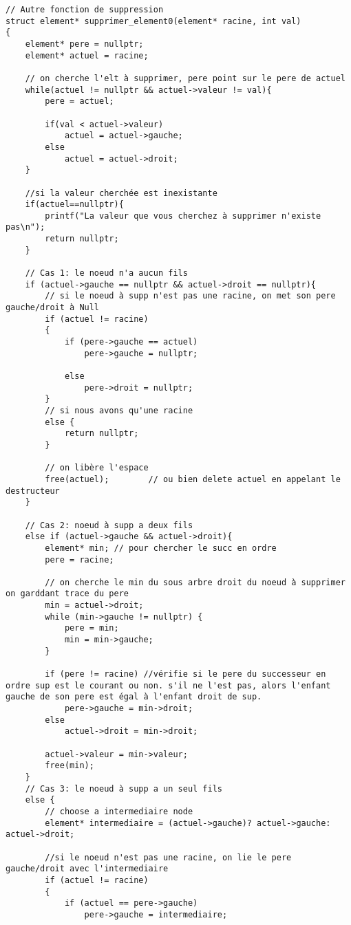 \begin{verbatim}
// Autre fonction de suppression
struct element* supprimer_element0(element* racine, int val)
{
    element* pere = nullptr;
    element* actuel = racine;
 
    // on cherche l'elt à supprimer, pere point sur le pere de actuel
    while(actuel != nullptr && actuel->valeur != val){
        pere = actuel;

        if(val < actuel->valeur)
            actuel = actuel->gauche;
        else
            actuel = actuel->droit;
    } 
 
    //si la valeur cherchée est inexistante
    if(actuel==nullptr){
        printf("La valeur que vous cherchez à supprimer n'existe pas\n");
        return nullptr;
    }
 
    // Cas 1: le noeud n'a aucun fils
    if (actuel->gauche == nullptr && actuel->droit == nullptr){
        // si le noeud à supp n'est pas une racine, on met son pere gauche/droit à Null
        if (actuel != racine)
        {
            if (pere->gauche == actuel) 
                pere->gauche = nullptr;
            
            else 
                pere->droit = nullptr;
        }
        // si nous avons qu'une racine
        else {
            return nullptr;
        }

        // on libère l'espace
        free(actuel);        // ou bien delete actuel en appelant le destructeur
    }

    // Cas 2: noeud à supp a deux fils
    else if (actuel->gauche && actuel->droit){
        element* min; // pour chercher le succ en ordre
        pere = racine;

        // on cherche le min du sous arbre droit du noeud à supprimer on garddant trace du pere 
        min = actuel->droit;
        while (min->gauche != nullptr) {
            pere = min;
            min = min->gauche;
        }

        if (pere != racine) //vérifie si le pere du successeur en ordre sup est le courant ou non. s'il ne l'est pas, alors l'enfant gauche de son pere est égal à l'enfant droit de sup.
            pere->gauche = min->droit;
        else
            actuel->droit = min->droit;

        actuel->valeur = min->valeur;
        free(min);
    }
    // Cas 3: le noeud à supp a un seul fils
    else {
        // choose a intermediaire node
        element* intermediaire = (actuel->gauche)? actuel->gauche: actuel->droit;

        //si le noeud n'est pas une racine, on lie le pere gauche/droit avec l'intermediaire  
        if (actuel != racine)
        {
            if (actuel == pere->gauche) 
                pere->gauche = intermediaire;
            

\end{verbatim}
